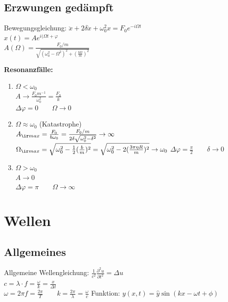 \documentclass[german]{latex4ei/latex4ei_sheet}
\begin{document}
\subsection{Erzwungen gedämpft}
Bewegungsgleichung: $\ddot{x}+2\delta \dot{x}+\omega_0^2x=F_0e^{-i\Omega t}$\\
$\hat{x}(t)=Ae^{i(\Omega t + \varphi}$\\
$A(\Omega)=\frac{F_0/m}{\sqrt{(\omega_0^2-\Omega^2)^2+(\frac{b\Omega}{m})^2}}$\\
\begin{sectionbox}
\textbf{Resonanzfälle:}
\begin{enumerate}
	\item $\Omega < \omega_0$\\
		$A\rightarrow \frac{F_0m^{-1}}{\omega_0^2}=\frac{F_0}{k}$\\
		$\Delta \varphi = 0 \qquad \Omega \rightarrow 0$
	\item $\Omega \approx \omega_0$ (Katastrophe)\\
		$A_{\ir max}=\frac{F_0}{b\omega_0}=\frac{F_0/m}{2\delta \sqrt{\omega_0^2-\delta^2}} \rightarrow \infty$\\
		$\Omega_{\ir max}=\sqrt{\omega_0^2-\frac{1}{2}(\frac{b}{m})^2}=\sqrt{\omega_0^2-2(\frac{3\pi \eta R}{m})^2}\rightarrow \omega_0$
		$\Delta \varphi = \frac{\pi}{2} \qquad \delta \rightarrow 0$
		\item $\Omega > \omega_0$\\
		$A\rightarrow 0$\\
		$\Delta \varphi = \pi \qquad \Omega \rightarrow \infty$
\end{enumerate}
\end{sectionbox}

\section{Wellen}
\subsection{Allgemeines}
Allgemeine Wellengleichung: $\frac{1}{c^2}\frac{\partial^2u}{\partial t^2}=\Delta u$\\
$c=\lambda \cdot f=\frac{\omega}{k}=\frac{x}{\Delta t}$\\
$\omega = 2\pi f=\frac{2\pi}{T} \qquad k=\frac{2\pi}{\lambda}=\frac{\omega}{c}$
Funktion: $y(x,t)=\hat{y}\sin(kx - \omega t + \phi)$
\end{document}
